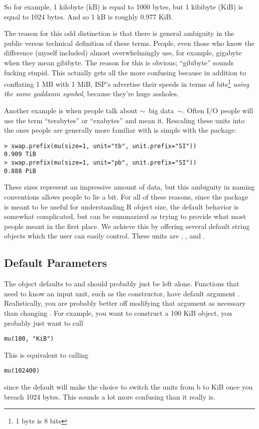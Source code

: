 So for example, 1 kilobyte (kB) is equal to 1000 bytes, but 1 kibibyte (KiB) is equal to 1024 bytes.  And so 1 kB is roughly $0.977$ KiB.

The reason for this odd distinction is that there is general ambiguity in the public versus technical definition of these terms.  People, even those who know the difference (myself included) almost overwhelmingly use, for example, gigabyte when they mean gibibyte.  The reason for this is obvious; ``gibibyte'' sounds fucking stupid.  This actually gets all the more confusing because in addition to conflating 1 MB with 1 MiB, ISP's advertise their speeds in terms of bits\footnote{1 byte is 8 bits} \emph{using the same goddamn symbol}, because they're huge assholes.

Another example is when people talk about $\sim$~\hspace{-.1cm}big data\hspace{-.1cm}~$\sim$.  Often I/O people will use the term ``terabytes'' or ``exabytes'' and mean it.  Rescaling these units into the ones people are generally more familiar with is simple with the  package:
\begin{lstlisting}[language=rr]
> swap.prefix(mu(size=1, unit="tb", unit.prefix="SI"))
0.909 TiB
> swap.prefix(mu(size=1, unit="pb", unit.prefix="SI"))
0.888 PiB
\end{lstlisting}

These sizes represent an impressive amount of data, but this ambiguity in naming conventions allows people to lie a bit.  For all of these reasons, since the package is meant to be useful for understanding R object size, the default behavior is somewhat complicated, but can be summarized as trying to provide what most people meant in the first place.  We achieve this by offering several default string objects which the user can easily control.  These units are , , and .  



\subsection{Default Parameters}

The  object defaults to  and should probably just be left alone.  Functions that need to know an input unit, such as the constructor, have default argument .  Realistically, you are probably better off modifying that argument as necessary than changing .  For example, you want to construct a 100 KiB  object, you probably just want to call
\begin{lstlisting}[language=rr]
mu(100, "KiB")
\end{lstlisting}
This is equivalent to calling
\begin{lstlisting}[language=rr]
mu(102400)
\end{lstlisting}
since the default  will make the choice to switch the units from b to KiB once you breach 1024 bytes.  This sounds a lot more confusing than it really is.

